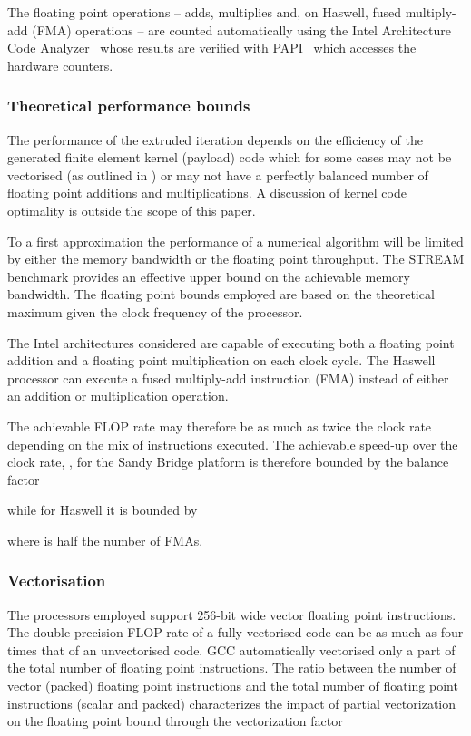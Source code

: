 \documentclass[11pt, a4paper]{scrartcl}
\begin{document}
The floating point operations -- adds, multiplies and, on Haswell,
fused multiply-add (FMA) operations -- are counted automatically using
the Intel Architecture Code Analyzer~\citep{iaca} whose results are
verified with PAPI~\citep{Mucci:1999} which accesses the hardware
counters.

\subsubsection{Theoretical performance bounds}
\label{sssec:performance-bounds}

The performance of the extruded iteration depends on the efficiency of
the generated finite element kernel (payload) code which for some
cases may not be vectorised (as outlined in \citet{Luporini:2015}) or
may not have a perfectly balanced number of floating point additions
and multiplications. A discussion of kernel code optimality is outside
the scope of this paper.

To a first approximation the performance of a numerical algorithm will
be limited by either the memory bandwidth or the floating point
throughput. The STREAM benchmark provides an effective upper bound on
the achievable memory bandwidth. The floating point bounds employed
are based on the theoretical maximum given the clock frequency of the
processor.

The Intel architectures considered are capable of executing both a
floating point addition and a floating point multiplication on each
clock cycle. The Haswell processor can execute a fused multiply-add
instruction (FMA) instead of either an addition or multiplication
operation.

The achievable FLOP rate may therefore be as much as twice the clock
rate depending on the mix of instructions executed. The achievable
speed-up over the clock rate, , for the Sandy Bridge platform
is therefore bounded by the balance factor

while for Haswell it is bounded by

where  is half the number of FMAs.

\subsubsection{Vectorisation}
\label{sssec:vectorisation}

The processors employed support 256-bit wide vector floating point
instructions. The double precision FLOP rate of a fully vectorised
code can be as much as four times that of an unvectorised code. GCC
automatically vectorised only a part of the total number of floating
point instructions. The ratio between the number of vector (packed)
floating point instructions and the total number of floating point
instructions (scalar and packed) characterizes the impact of partial
vectorization on the floating point bound through the vectorization
factor
\end{document}
